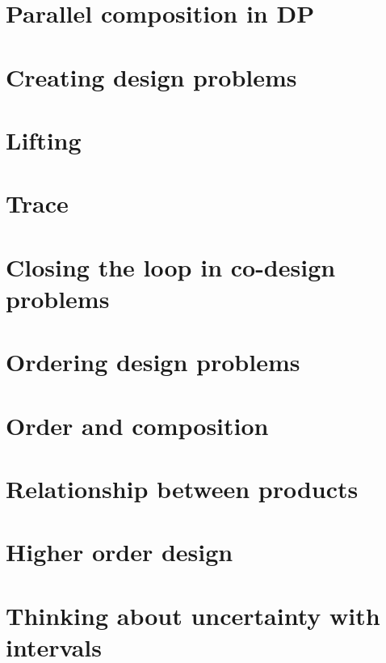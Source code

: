 \documentclass[paper=6in:9in,pagesize=pdftex,
 headinclude=off,footinclude=on,11pt,twoside]{scrbook}
\begin{document}
\chapter{Parallel composition in DP}

\clearpage

\chapter{Creating design problems}

\clearpage
%
\chapter{Lifting}

\clearpage
%
\chapter{Trace}

\clearpage
%
\chapter{Closing the loop in co-design problems}

\clearpage

\chapter{Ordering design problems}

\clearpage
%
\chapter{Order and composition}

\clearpage
%
\chapter{Relationship between products}

\clearpage

\chapter{Higher order design}

\clearpage
%
\chapter{Thinking about uncertainty with intervals}

\clearpage
%
\end{document}
